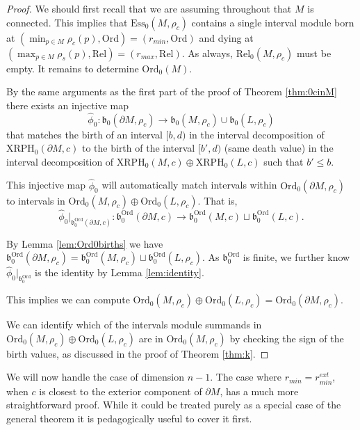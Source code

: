 \documentclass[a4paper,11pt]{article}
\theoremstyle{definition}
\newcommand{\Ord}{\textrm{Ord}}
\newcommand{\birth}{\mathfrak{b}}
\begin{document}
\begin{proof}



We should first recall that we are assuming throughout that $M$ is connected. This implies that $\mathrm{Ess}_0(M,\rho_c)$ contains a single interval module born at $(\min_{p\in M}\rho_c(p), \mathrm{Ord})=(r_{min}, \mathrm{Ord})$ and dying at $(\max_{p\in M}\rho_s(p), \mathrm{Rel})=(r_{max},\mathrm{Rel})$. As always, $\mathrm{Rel}_0(M, \rho_c)$ must be empty. It remains to determine $\mathrm{Ord}_0(M)$.

By the same arguments as the first part of the proof of Theorem \ref{thm:0cinM} there exists an injective map 
$$\hat{\phi}_0: \birth_0(\partial M, \rho_c) \to \birth_0(M, \rho_c)\cup \birth_0(L, \rho_c)$$
that matches the birth of an interval $[b,d)$ in the interval decomposition of $\text{XRPH}_0(\partial M, c)$ to the birth of the interval $[b',d)$ (same death value) in the interval decomposition of $\text{XRPH}_0(M,c)\oplus \text{XRPH}_0(L,c)$ such that $b'\leq b$.

This injective map $\hat{\phi}_0$ will automatically match intervals within $\mathrm{Ord}_0(\partial M, \rho_c)$ to intervals in $\mathrm{Ord}_0(M, \rho_c)\oplus \mathrm{Ord}_0(L, \rho_c)$.
That is, $$\hat{\phi}_0|_{\birth_0^{\Ord}(\partial M, c)}: \birth_0^{\Ord}(\partial M, c) \to \birth_0^{\Ord}(M, c)\sqcup \birth_0^{\Ord}(L, c).$$

By Lemma \ref{lem:Ord0births} we have $\mathfrak{b}_0^{\Ord}(\partial M,\rho_c)=\mathfrak{b}_0^{\Ord}(M,\rho_c)\sqcup \mathfrak{b}_0^{\Ord}(L,\rho_c).$ As $\mathfrak{b}_0^{\Ord}$ is finite, 
we further know $\hat{\phi}_0|_{\mathfrak{b}_0^{\Ord}}$ is the identity by Lemma \ref{lem:identity}.

This implies we can compute $\mathrm{Ord}_0(M,\rho_c)\oplus \mathrm{Ord}_0(L,\rho_c)=\mathrm{Ord}_0(\partial M,\rho_c)$.

We can identify which of the intervals module summands in $\mathrm{Ord}_0(M,\rho_c)\oplus \mathrm{Ord}_0(L,\rho_c)$ are in $\mathrm{Ord}_0(M,\rho_c)$ by checking the sign of the birth values, as discussed in the proof of Theorem \ref{thm:k}.
\end{proof}


We will now handle the case of dimension $n-1$. The case where $r_{min}=r_{min}^{ext}$, when $c$ is closest to the  exterior component of $\partial M$, has a much more straightforward proof. While it could be treated purely as a special case of the general theorem it is pedagogically useful to cover it first.  
\end{document}
